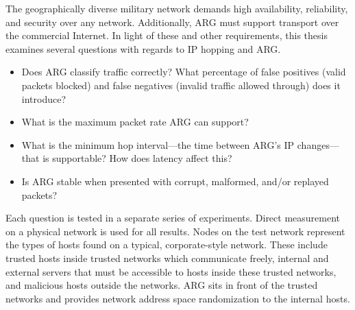 \par The geographically diverse military network demands high availability, reliability, and security over any network. Additionally, \ac{ARG} must support transport over the commercial Internet. In light of these and other requirements, this thesis examines several questions with regards to \ac{IP} hopping and \ac{ARG}.
\begin{itemize}
	\item Does \ac{ARG} classify traffic correctly? What percentage of false positives (valid packets blocked) and false negatives (invalid traffic allowed through) does it introduce?
	\item What is the maximum packet rate \ac{ARG} can support?
	\item What is the minimum hop interval---the time between ARG's \ac{IP} changes---that is supportable? How does latency affect this?
	\item Is \ac{ARG} stable when presented with corrupt, malformed, and/or replayed packets?
\end{itemize}

\par Each question is tested in a separate series of experiments. Direct measurement on a physical network is used for all results. Nodes on the test network represent the types of hosts found on a typical, corporate-style network. These include trusted hosts inside trusted networks which communicate freely, internal and external servers that must be accessible to hosts inside these trusted networks, and malicious hosts outside the networks. \ac{ARG} sits in front of the trusted networks and provides network address space randomization to the internal hosts.



